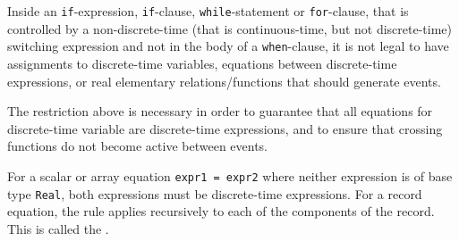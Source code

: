 Inside an \lstinline!if!-expression, \lstinline!if!-clause, \lstinline!while!-statement or \lstinline!for!-clause, that is controlled by a non-discrete-time (that is continuous-time, but not discrete-time) switching expression and not in the body of a \lstinline!when!-clause, it is not legal to have assignments to discrete-time variables, equations between discrete-time expressions, or real elementary relations/functions that should generate events.

\begin{nonnormative}
The restriction above is necessary in order to guarantee that all equations for discrete-time variable are discrete-time expressions, and to ensure that crossing functions do not become active between events.
\end{nonnormative}

For a scalar or array equation \lstinline!expr1 = expr2! where neither expression is of base type \lstinline!Real!, both expressions must be discrete-time expressions.
For a record equation, the rule applies recursively to each of the components of the record.
This is called the .

